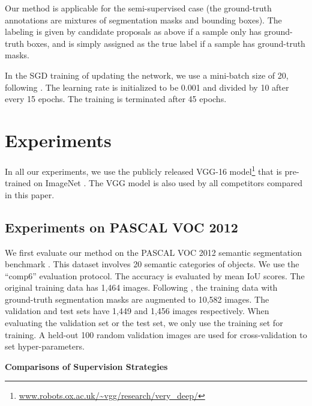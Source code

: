 \documentclass[10pt,twocolumn,letterpaper]{article}
\begin{document}
Our method is applicable for the semi-supervised case (the ground-truth annotations are mixtures of segmentation masks and bounding boxes). The labeling  is given by candidate proposals as above if a sample only has ground-truth boxes, and is simply assigned as the true label if a sample has ground-truth masks.

In the SGD training of updating the network, we use a mini-batch size of 20, following \cite{Long2015}. The learning rate is initialized to be 0.001 and divided by 10 after every 15 epochs. The training is terminated after 45 epochs.



\section{Experiments}


In all our experiments, we use the publicly released VGG-16 model\footnote{\url{www.robots.ox.ac.uk/~vgg/research/very_deep/}} \cite{Simonyan2015} that is pre-trained on ImageNet \cite{Russakovsky2014}. The VGG model is also used by all competitors \cite{Long2015,Hariharan2015,Dai2015,Chen2015,mostajabi2014feedforward} compared in this paper.


\subsection{Experiments on PASCAL VOC 2012}

We first evaluate our method on the PASCAL VOC 2012 semantic segmentation benchmark \cite{everingham2010pascal}. This dataset involves 20 semantic categories of objects. We use the ``comp6'' evaluation protocol.
The accuracy is evaluated by mean IoU scores.
The original training data has 1,464 images.
Following \cite{hariharan2011semantic}, the training data with ground-truth segmentation masks are augmented to 10,582 images. The validation and test sets have 1,449 and 1,456 images respectively. When evaluating the validation set or the test set, we only use the training set for training.
A held-out 100 random validation images are used for cross-validation to set hyper-parameters.

\vspace{8pt}
\noindent\textbf{Comparisons of Supervision Strategies}
\end{document}
